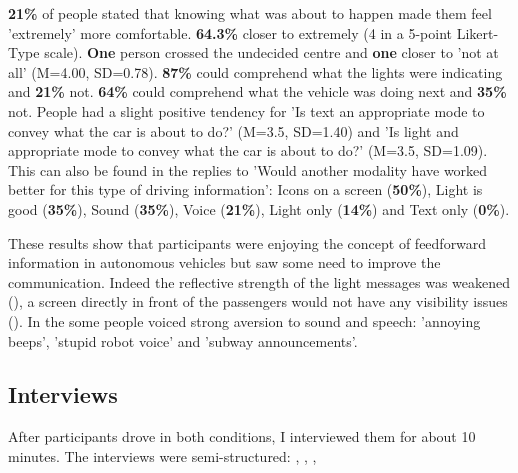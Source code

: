 \textbf{21\%} of people stated that knowing what was about to happen made them feel 'extremely' more comfortable. \textbf{64.3\%} closer to extremely (4 in a 5-point Likert-Type scale). \textbf{One} person crossed the undecided centre and \textbf{one} closer to 'not at all' (M=4.00, SD=0.78). \textbf{87\%} could comprehend what the lights were indicating and \textbf{21\%} not. \textbf{64\%} could comprehend what the vehicle was doing next and \textbf{35\%} not. People had a slight positive tendency for 'Is text an appropriate mode to convey what the car is about to do?' (M=3.5, SD=1.40) and  'Is light and appropriate mode to convey what the car is about to do?' (M=3.5, SD=1.09). This can also be found in the replies to 'Would another modality have worked better for this type of driving information': Icons on a screen (\textbf{50\%}), Light is good (\textbf{35\%}), Sound (\textbf{35\%}), Voice (\textbf{21\%}), Light only (\textbf{14\%}) and Text only (\textbf{0\%}). 

These results show that participants were enjoying the concept of feedforward information in autonomous vehicles but saw some need to improve the communication. Indeed the reflective strength of the light messages was weakened (\emph{}), a screen directly in front of the passengers would not have any visibility issues (\emph{}). In the \emph{} some people voiced strong aversion to sound and speech: 'annoying beeps', 'stupid robot voice' and 'subway announcements'. 

\subsection{Interviews}
\label{ssec:interviews}
After participants drove in both conditions, I interviewed them for about 10 minutes. The interviews were semi-structured: , , , 

